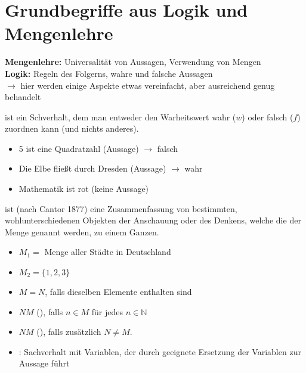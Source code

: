\section{Grundbegriffe aus Logik und Mengenlehre}

\textbf{Mengenlehre:} Universalität von Aussagen, Verwendung von Mengen \\
\textbf{Logik:} Regeln des Folgerns, wahre und falsche Aussagen \\
$\to$ hier werden einige Aspekte etwas vereinfacht, aber ausreichend genug behandelt

\begin{definition}[Aussage]
	 ist ein Schverhalt, dem man entweder den Warheitswert wahr ($w$) oder falsch ($f$) zuordnen kann (und nichts anderes).
\end{definition}

\begin{example}
	\begin{itemize}
		\item 5 ist eine Quadratzahl (Aussage) $\to$ falsch
		\item Die Elbe fließt durch Dresden (Aussage) $\to$ wahr
		\item Mathematik ist rot (keine Aussage)
	\end{itemize}
\end{example}
	
\begin{definition}[Menge]
	 ist (nach Cantor 1877) eine Zusammenfassung von bestimmten, wohlunterschiedenen Objekten der Anschauung oder des Denkens, welche die  der Menge genannt werden, zu einem Ganzen.
\end{definition}

\begin{example}
	\begin{itemize}
		\item $M_1=$ Menge aller Städte in Deutschland
		\item $M_2=\{1,2,3\}$
	\end{itemize}
\end{example}

\begin{definition}
	\begin{itemize}
		\item $M=N$, falls dieselben Elemente enthalten sind
		\item $N$$M$ (), falls $n\in M$ für jedes $n\in\mathbb{N}$
		\item $N$$M$ (), falls zusätzlich $N\neq M$.
		\item {}: Sachverhalt mit Variablen, der durch geeignete Ersetzung der Variablen zur Aussage führt
	\end{itemize}
\end{definition}

